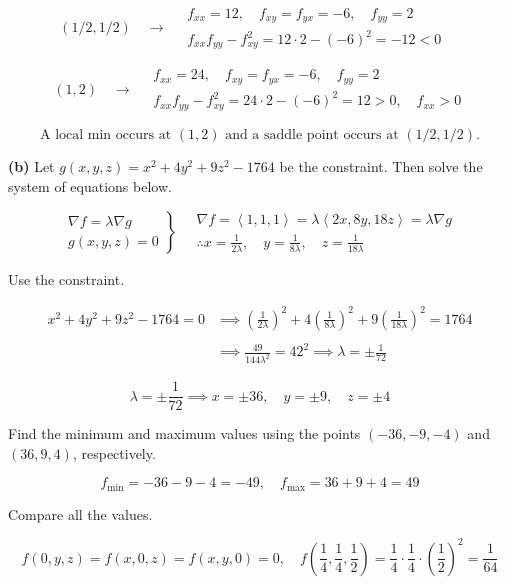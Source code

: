 \documentclass{article}
\begin{document}
\[(1/2,1/2)\quad\rightarrow\quad\begin{array}{l}f_{xx}=12,\quad f_{xy}=f_{yx}=-6,\quad f_{yy}=2\\[1em]
f_{xx}f_{yy}-f_{xy}^2=12\cdot2-(-6)^2=-12<0\quad\end{array}\]

\[(1,2)\quad\rightarrow\quad\begin{array}{l}f_{xx}=24,\quad f_{xy}=f_{yx}=-6,\quad f_{yy}=2\\[1em]f_{xx}f_{yy}-f_{xy}^2=24\cdot2-(-6)^2=12>0,\quad f_{xx}>0\end{array}\]

\[\boxed{\text{A local min occurs at } (1,2) \text{ and a saddle point occurs at } (1/2,1/2).}\]

\textbf{(b)} Let $g(x,y,z)=x^2+4y^2+9z^2-1764$ be the constraint. Then solve the system of equations below.

\[
\left.
\begin{array}{ll}
\displaystyle\nabla f=\lambda\nabla g\\
\displaystyle g(x,y,z)=0
\end{array}
\right\}\quad
\begin{array}{ll}
\nabla f=\left\langle1,1,1\right\rangle=\lambda\left\langle2x,8y,18z\right\rangle=\lambda\nabla g\\[1em]\displaystyle\therefore x=\frac1{2\lambda},\quad y=\frac1{8\lambda},\quad z=\frac1{18\lambda}
\end{array}
\]

Use the constraint.

\begin{align*}x^2+4y^2+9z^2-1764=0&\implies\left(\frac1{2\lambda}\right)^2+4\left(\frac1{8\lambda}\right)^2+9\left(\frac1{18\lambda}\right)^2=1764\\\\&\implies \frac{49}{144\lambda^2}=42^2\implies\lambda=\pm\frac1{72}\end{align*}

\[\lambda=\pm\frac1{72}\implies x=\pm36,\quad y=\pm9,\quad z=\pm4\]

Find the minimum and maximum values using the points $(-36,-9,-4)$ and $(36,9,4)$, respectively.

\[\boxed{f_{\text{min}}=-36-9-4=-49,\quad f_{\text{max}}=36+9+4=49}\]

Compare all the values.

\[f(0,y,z)=f(x,0,z)=f(x,y,0)=0,\quad f\left(\frac14,\frac14,\frac12\right)=\frac14\cdot\frac14\cdot\left(\frac12\right)^2=\frac1{64}\]
\end{document}
